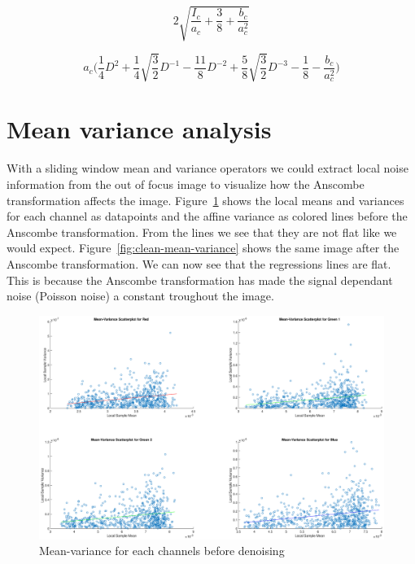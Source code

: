 \documentclass[12pt,a4paper,english
]{tunithesis}
\begin{document}
\begin{equation}
\label{eq:anscombe}
  2 \sqrt{\frac{I_{c}}{a_{c}} + \frac{3}{8} + \frac{b_{c}}{a_{c}^2}}
\end{equation}

\begin{equation}
\label{eq:anscombe-inv}
  a_{c} \Bigg( \frac{1}{4}D^2 + \frac{1}{4}\sqrt{\frac{3}{2}}D^{-1} - \frac{11}{8}D^{-2} + \frac{5}{8} \sqrt{\frac{3}{2}}D^{-3} - \frac{1}{8} - \frac{b_{c}}{a_{c}^2} \Bigg)
  \end{equation}

\section{Mean variance analysis}
With a sliding window mean and variance operators we could extract local noise information from the out of focus image to visualize how the Anscombe transformation affects the image. Figure~\ref{fig:noisy-mean-variance} shows the local means and variances for each channel as datapoints and the affine variance as colored lines before the Anscombe transformation. From the lines we see that they are not flat like we would expect. Figure~\ref{fig:clean-mean-variance} shows the same image after the Anscombe transformation. We can now see that the regressions lines are flat. This is because the Anscombe transformation has made the signal dependant noise (Poisson noise) a constant troughout the image.

\begin{figure}
  \includegraphics[width=\textwidth]{img/noisy-mean-variance.eps}
  \caption{Mean-variance for each channels before denoising}
  \label{fig:noisy-mean-variance}
\end{figure}
\end{document}
